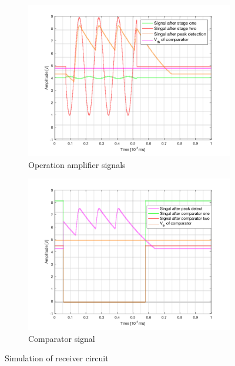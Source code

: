 \begin{figure}[H]
\centering
\begin{subfigure}{.5\textwidth}
  \centering
  \includegraphics[width=1.0\textwidth]{Figures/receiver_simulations.PNG}
  \caption{Operation amplifier signals}
  \label{fig:sim_receive}
\end{subfigure}%
\begin{subfigure}{.5\textwidth}
  \centering
  \includegraphics[width=1.0\textwidth]{Figures/receiver_simulations2.PNG}
  \caption{Comparator signal}
  \label{fig:sim_receive2}
\end{subfigure}
\caption{Simulation of receiver circuit}
\label{fig:simulationreceiver}
\end{figure}


